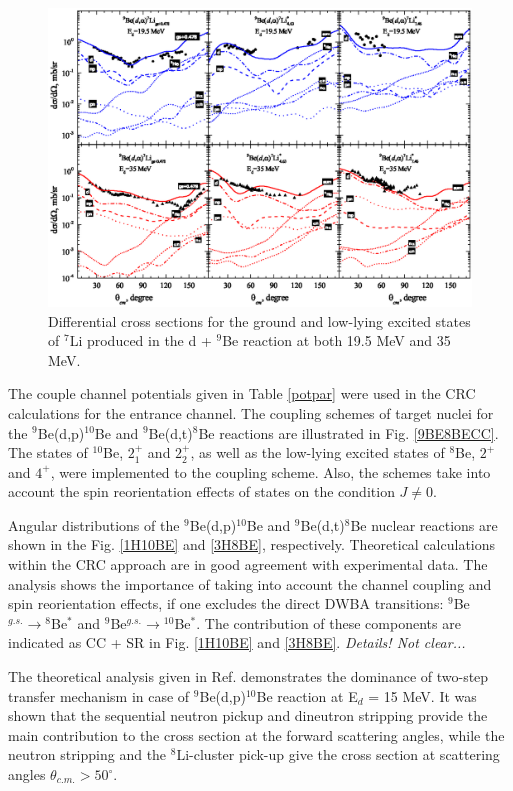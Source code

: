 \documentclass[10pt]{iopart}
\begin{document}
\begin{figure}[bp]
\centering
\includegraphics[scale=0.9]{4HE7LI.eps}
\caption{\label{label} Differential cross sections for the ground and low-lying excited states of $^{7}$Li  produced in the d + $^9$Be reaction at  both 19.5 MeV and 35 MeV. }
\label{4HE7LI}
\end{figure}	

The couple channel potentials given in Table \ref{potpar} were used in the CRC calculations for the entrance channel. The coupling schemes of target nuclei for the ${}^9$Be(d,p)${}^{10}$Be and ${}^9$Be(d,t)${}^8$Be  reactions  are illustrated in Fig. \ref{9BE8BECC}. The states of ${}^{10}$Be, $2^+_{1}$ and $2^+_{2}$, as well as the low-lying excited states of ${}^8$Be, $2^+$ and $4^+$, were implemented to the coupling scheme. Also, the schemes take into account the spin reorientation effects of states on the condition $J \neq 0$.

Angular distributions of the ${}^9$Be(d,p)${}^{10}$Be and  ${}^9$Be(d,t)${}^{8}$Be nuclear reactions are shown in the Fig. \ref{1H10BE} and \ref{3H8BE}, respectively. Theoretical calculations within the CRC approach are in good agreement with experimental data. The analysis shows the importance of taking into account the channel coupling and spin reorientation effects, if one excludes the direct DWBA transitions: ${}^9$Be$^{g.s.}\rightarrow {}^8$Be$^*$ and ${}^9$Be$^{g.s.}\rightarrow {}^{10}$Be$^*$. The contribution of these components are indicated as CC + SR in Fig. \ref{1H10BE} and \ref{3H8BE}. \textit{Details! Not clear...}

The theoretical analysis given in Ref. \cite{galanina2012} demonstrates the dominance of two-step transfer mechanism in case of ${}^9$Be(d,p)${}^{10}$Be reaction at E$_d$ = 15 MeV. It was shown that the sequential neutron pickup and dineutron stripping provide the main contribution to the cross section at the forward scattering angles, while the neutron stripping and the ${}^8$Li-cluster pick-up give the cross section at scattering angles $\theta_{c.m.} > 50^\circ$.
\end{document}
